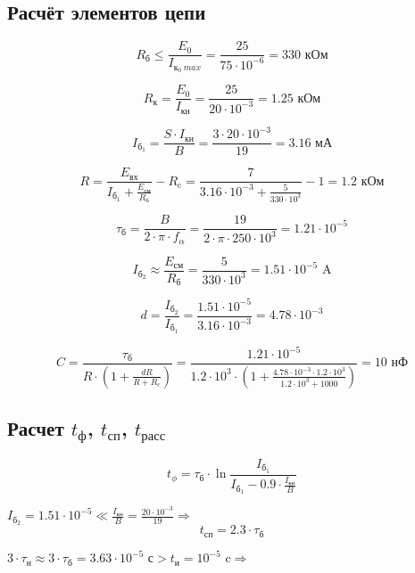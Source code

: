 \subsection{Расчёт элементов цепи}

\[
R_\text{б} \leq \frac{E_0}{I_{\text{к}_0\ max}} = \frac{25}{75 \cdot 10^{-6}} = 330 \text{ кОм}
\]

\[
R_\text{к} = \frac{E_0}{I_\text{кн}} = \frac{25}{20 \cdot 10^{-3}} = 1.25 \text{ кОм}
\]

\[
I_{\text{б}_1} = \frac{S \cdot I_\text{кн}}{B} = \frac{3 \cdot 20 \cdot 10^{-3}}{19} = 3.16 \text{ мА}
\]

\[
R = \frac{E_\text{вх}}{I_{\text{б}_1} + \frac{E_\text{см}}{R_\text{б}}} - R_\text{c} = \frac{7}{3.16 \cdot 10^{-3} + \frac{5}{330 \cdot 10^3}} - 1 = 1.2 \text{ кОм}
\]

\[
\tau_{\text{б}} = \frac{B}{2 \cdot \pi \cdot f_\alpha} = \frac{19}{2 \cdot \pi \cdot 250 \cdot 10^3} = 1.21 \cdot 10^{-5}
\]

\[
I_{\text{б}_2} \approx \frac{E_\text{см}}{R_\text{б}} = \frac{5}{330 \cdot 10^3} = 1.51 \cdot 10^{-5} \text{ A}
\]

\[
d = \frac{I_{\text{б}_2}}{I_{\text{б}_1}} = \frac{ 1.51 \cdot 10^{-5}}{3.16 \cdot 10^{-3}} = 4.78 \cdot 10^{-3}
\]

\[
C = \frac{\tau_{\text{б}}}{R \cdot \left( 1 + \frac{dR}{R+R_c} \right)} = \frac{1.21 \cdot 10^{-5}}{1.2 \cdot 10^3 \cdot \left( 1 + \frac{4.78 \cdot 10^{-3} \cdot 1.2 \cdot 10^3}{1.2 \cdot 10^3+1000} \right)} = 10 \text{ нФ}
\]

\subsection{Расчет $t_\text{ф}$, $t_\text{сп}$, $t_\text{расс}$}

\begin{equation}\label{eq:t_f}
t_\phi = \tau_{\text{б}} \cdot \ln{\frac{I_{\text{б}_1}}{I_{\text{б}_1} - 0.9 \cdot \frac{I_\text{кн}}{B}}}
\end{equation}

$I_{\text{б}_2} = 1.51 \cdot 10^{-5} \ll \frac{I_\text{кн}}{B} = \frac{20 \cdot 10^{-3}}{19} \Rightarrow$
\begin{equation}\label{eq:t_sp}
t_\text{сп} = 2.3 \cdot \tau_\text{б}
\end{equation}

$3 \cdot \tau_\text{н} \approx 3 \cdot \tau_{\text{б}} = 3.63 \cdot 10^{-5} \text{ с} > t_\text{и} = 10^{-5} \text{ c} \Rightarrow$

